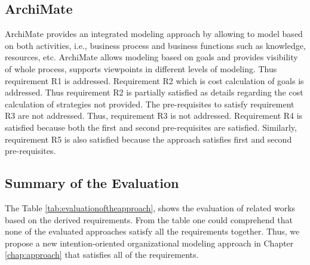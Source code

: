 \subsection{ArchiMate}
ArchiMate provides an integrated modeling approach by allowing to model based on both activities, i.e., business process and business functions such as knowledge, resources, etc. ArchiMate allows modeling based on goals and provides visibility of whole process, supports viewpoints in different levels of modeling. Thus requirement R1 is addressed. Requirement R2 which is cost calculation of goals is addressed. Thus requirement R2 is partially satisfied as details regarding the cost calculation of strategies not provided. The pre-requisites to satisfy requirement R3 are not addressed. Thus, requirement R3 is not addressed. Requirement R4 is satisfied because both the first and second pre-requisites are satisfied. Similarly, requirement R5 is also satisfied because the approach satisfies first and second pre-requisites.  

\subsection {Summary of the Evaluation}
 The Table \ref{tab:evaluationoftheapproach}, shows the evaluation of related works based on the derived requirements. From the table one could comprehend that none of the evaluated approaches satisfy all the requirements together. Thus, we propose a new intention-oriented organizational modeling approach in Chapter \ref{chap:approach} that satisfies all of the requirements. 

